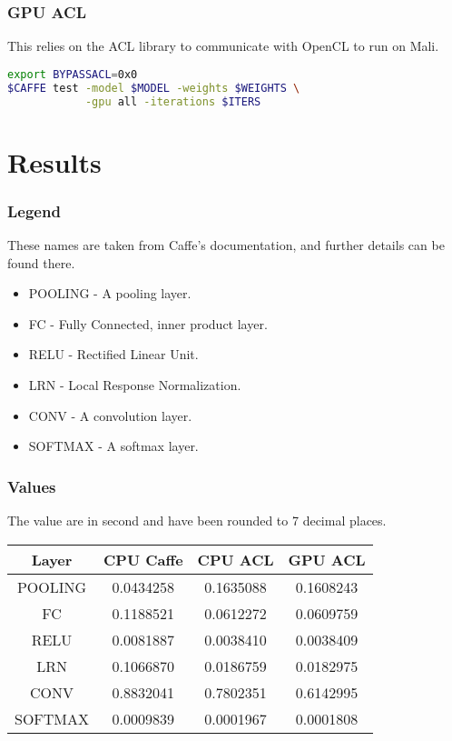 \documentclass[12pt, a4paper, notitlepage]{report}
\begin{document}
\subsubsection*{GPU ACL}
This relies on the ACL library to communicate with OpenCL to run on Mali.\cite{acl}
\begin{lstlisting}[language=bash]
export BYPASSACL=0x0
$CAFFE test -model $MODEL -weights $WEIGHTS \
            -gpu all -iterations $ITERS
\end{lstlisting}

\section*{Results}
\subsubsection*{Legend}
These names are taken from Caffe's documentation, and further details can be found there.\cite{caffe}
\begin{itemize}
	\item POOLING - A pooling layer.
	\item FC - Fully Connected, inner product layer.
	\item RELU - Rectified Linear Unit.
	\item LRN - Local Response Normalization.
	\item CONV - A convolution layer.
	\item SOFTMAX - A softmax layer.
\end{itemize}

\subsubsection*{Values}
The value are in second and have been rounded to 7 decimal places.
\begin{center}
\begin{tabular}{ | c | c | c | c |}
\hline
Layer & CPU Caffe & CPU ACL & GPU ACL \\
\hline
POOLING & 0.0434258 & 0.1635088 & 0.1608243 \\
\hline
FC & 0.1188521 & 0.0612272 & 0.0609759 \\
\hline
RELU & 0.0081887 & 0.0038410 & 0.0038409 \\
\hline
LRN & 0.1066870 & 0.0186759 & 0.0182975 \\
\hline
CONV & 0.8832041 & 0.7802351 & 0.6142995 \\
\hline
SOFTMAX & 0.0009839 & 0.0001967 & 0.0001808 \\
\hline
\end{tabular}
\end{center}
\end{document}
